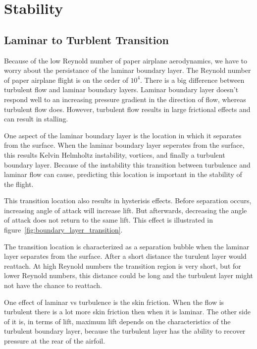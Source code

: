 
\section{Stability}

\subsection{Laminar to Turblent Transition}

Because of the low Reynold number of paper airplane aerodynamics, we have to worry about
the persistance of the laminar boundary layer.
The Reynold number of paper airplane flight is on the order of $10^4$.
There is a big difference between turbulent flow and laminar boundary
layers. Laminar boundary layer doesn't respond well to an increasing
pressure gradient in the direction of flow, whereas turbulent flow does.
However, turbulent flow results in large frictional effects and can result in stalling.

One aspect of the laminar boundary layer is the location in which it separates from the surface.
When the laminar boundary layer seperates from the surface, this results Kelvin
Helmholtz instability, vortices, and finally a turbulent boundary layer. 
Because of the instability this transition between turbulence and laminar flow 
can cause, predicting this location is important in the stability of the flight. 

This transition location also results in hysterisis effects. Before separation
occurs, increasing angle of attack will increase lift. But afterwards,
decreasing the angle of attack does not return to the same lift. This effect is
illustrated in figure~\ref{fig:boundary_layer_transition}.

The transition location is characterized as a separation bubble when the laminar layer
separates from the surface. After a short distance the turulent layer would reattach.
At high Reynold numbers the transition region is very short, but for lower Reynold
numbers, this distance could be long and the turbulent layer might not have the chance
to reattach. 

One effect of laminar vs turbulence is the skin friction. When the flow is turbulent there
is a lot more skin friction then when it is laminar. The other side of it is, 
in terms of lift, maximum
lift depends on the characteristics of the turbulent boundary layer, because the
turbulent layer has the ability to recover pressure at the
rear of the airfoil. 

